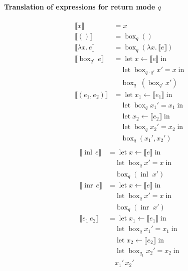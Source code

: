 \documentclass[acmsmall,screen,nonacm]{acmart}
\DeclareMathOperator{\llet}{\text{let}}
\DeclareMathOperator{\lin}{\text{in}}
\DeclareMathOperator{\bbox}{\text{box}}
\DeclareMathOperator{\inl}{\text{inl}}
\DeclareMathOperator{\inr}{\text{inr}}
\newcommand{\sem}[1]{\llbracket #1 \rrbracket}
\begin{document}
\paragraph{Translation of expressions for return mode $q$}
%
\begin{align*}
  \sem{x} &= x \\
  \sem{()} &= \bbox_{q} () \\
  \sem{\lambda x.\, e} &= \bbox_q (\lambda x.\, \sem{e}) \\
  \sem{\bbox_{q'}\, e} &= \llet x \leftarrow \sem{e} \lin \\
                    &\quad \llet \bbox_{q \cdot q'} x' = x \lin \\
                    &\quad \bbox_{q}\; (\bbox_{q'} x') \\
  \sem{(e_1, e_2)} &= \llet x_1 \leftarrow \sem{e_1} \lin \\
                   &\quad \llet \bbox_q x_1' = x_1 \lin \\
                   &\quad \llet x_2 \leftarrow \sem{e_2} \lin \\
                   &\quad \llet \bbox_q x_2' = x_2 \lin \\
                   &\quad \bbox_q (x_1', x_2') \\
\end{align*}
\begin{align*}
  \sem{\inl\, e} &= \llet x \leftarrow \sem{e} \lin \\
                 &\quad \llet \bbox_q x' = x \lin \\
                 &\quad \bbox_q (\inl\; x')  \\
  \sem{\inr\, e} &= \llet x \leftarrow \sem{e} \lin \\
                 &\quad \llet \bbox_q x' = x \lin \\
                 &\quad \bbox_q (\inr\; x') \\
  \sem{e_1\, e_2} &= \llet x_1 \leftarrow \sem{e_1} \lin \\
                   &\quad \llet \bbox_q x_1' = x_1 \lin \\
                   &\quad \llet x_2 \leftarrow \sem{e_2} \lin \\
                   &\quad \llet \bbox_{q_1} x_2' = x_2 \lin \\
                   &\quad x_1' \, x_2' \\
\end{align*}
%
\end{document}
